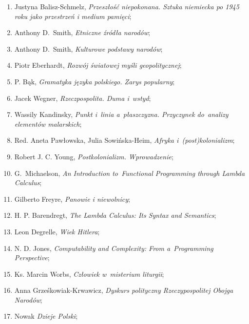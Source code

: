 \documentclass[a4paper,11pt]{article}
\begin{document}
\begin{enumerate}
\item Justyna Balisz-Schmelz, \textit{Przeszłość niepokonana. Sztuka
    niemiecka po 1945 roku jako przestrzeń i medium pamięci};

\item Anthony D.~Smith, \textit{Etniczne źródła narodów};

\item Anthony D.~Smith, \textit{Kulturowe podstawy narodów};

\item Piotr Eberhardt, \textit{Rozwój światowej myśli geopolitycznej};

\item P. Bąk, \textit{Gramatyka języka polskiego. Zarys popularny};

\item Jacek Wegner, \textit{Rzeczpospolita. Duma i~wstyd};

\item Wassily Kandinsky, \textit{Punkt i~linia a~płaszczyzna. Przyczynek
    do~analizy elementów malarskich};

\item Red. Aneta Pawłowska, Julia Sowińska-Heim, \textit{Afryka
    i~(post)kolonializm};

\item Robert J. C. Young, \textit{Postkolonializm. Wprowadzenie};

\item G.~Michaelson, \textit{An Introduction to~Functional Programming
    through Lambda Calculus};

\item Gilberto Freyre, \textit{Panowie i niewolnicy};

\item H. P. Barendregt, \textit{The Lambda Calculus: Its Syntax and
    Semantics};

\item Leon Degrelle, \textit{Wiek Hitlera};

\item N. D. Jones, \textit{Computability and Complexity: From
    a~Programming Perspective};

\item Ks. Marcin Worbs, \textit{Człowiek w~misterium liturgii};

\item Anna Grześkowiak-Krwawicz, \textit{Dyskurs polityczny
    Rzeczypospolitej Obojga Narodów};

\item Nowak \textit{Dzieje Polski};


\end{enumerate}
\end{document}
